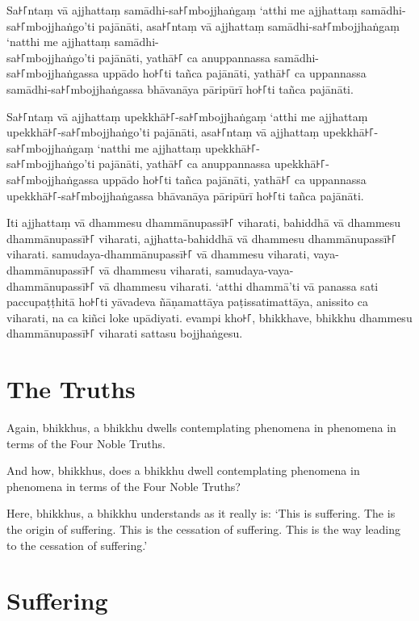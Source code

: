 Sa꜔꜒ntaṃ vā ajjhattaṃ samādhi-sa꜔꜒mbojjhaṅgaṃ ‘atthi me ajjhattaṃ samādhi-sa꜔꜒mbojjhaṅgo’ti pajānāti,
asa꜔꜒ntaṃ vā ajjhattaṃ samādhi-sa꜔꜒mbojjhaṅgaṃ ‘natthi me ajjhattaṃ samādhi-\\ sa꜔꜒mbojjhaṅgo’ti pajānāti,
yathā꜔꜒ ca anuppannassa samādhi-\\ sa꜔꜒mbojjhaṅgassa uppādo ho꜔꜒ti tañca pajānāti,
yathā꜔꜒ ca uppannassa samādhi-sa꜔꜒mbojjhaṅgassa bhāvanāya pāripūrī ho꜔꜒ti tañca pajānāti.

Sa꜔꜒ntaṃ vā ajjhattaṃ upekkhā꜔꜒-sa꜔꜒mbojjhaṅgaṃ ‘atthi me ajjhattaṃ upekkhā꜔꜒-sa꜔꜒mbojjhaṅgo’ti pajānāti,
asa꜔꜒ntaṃ vā ajjhattaṃ upekkhā꜔꜒-sa꜔꜒mbojjhaṅgaṃ ‘natthi me ajjhattaṃ upekkhā꜔꜒-\\ sa꜔꜒mbojjhaṅgo’ti pajānāti,
yathā꜔꜒ ca anuppannassa upekkhā꜔꜒-\\ sa꜔꜒mbojjhaṅgassa uppādo ho꜔꜒ti tañca pajānāti,
yathā꜔꜒ ca uppannassa upekkhā꜔꜒-sa꜔꜒mbojjhaṅgassa bhāvanāya pāripūrī ho꜔꜒ti tañca pajānāti.

Iti ajjhattaṃ vā dhammesu dhammānupassī꜔꜒ viharati,
bahiddhā vā dhammesu dhammānupassī꜔꜒ viharati,
ajjhatta-bahiddhā vā dhammesu dhammānupassī꜔꜒ viharati.
samudaya-dhammānupassī꜔꜒ vā dhammesu viharati,
vaya-dhammānupassī꜔꜒ vā dhammesu viharati,
samudaya-vaya-\\ dhammānupassī꜔꜒ vā dhammesu viharati.
‘atthi dhammā’ti vā panassa sati paccupaṭṭhitā ho꜔꜒ti
yāvadeva ñāṇamattāya paṭissatimattāya, anissito ca viharati,
na ca kiñci loke upādiyati. evampi kho꜔꜒, bhikkhave, bhikkhu
dhammesu dhammānupassī꜔꜒ viharati sattasu bojjhaṅgesu.

\enlargethispage{\baselineskip}


\englishPage
\section*{The Truths}%

Again, bhikkhus, a bhikkhu dwells contemplating phenomena in phenomena in terms
of the Four Noble Truths.

And how, bhikkhus, does a bhikkhu dwell contemplating phenomena in phenomena in
terms of the Four Noble Truths?

Here, bhikkhus, a bhikkhu understands as it really is: `This is suffering. The
is the origin of suffering. This is the cessation of suffering. This is the way
leading to the cessation of suffering.'

\section{Suffering}

